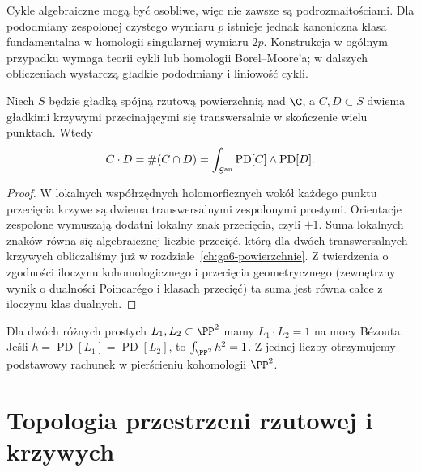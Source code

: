\begin{uwaga}
Cykle algebraiczne mogą być osobliwe, więc nie zawsze są
podrozmaitościami. Dla pododmiany zespolonej czystego wymiaru
$p$ istnieje jednak kanoniczna klasa fundamentalna w homologii
singularnej wymiaru $2p$. Konstrukcja w ogólnym przypadku
wymaga teorii cykli lub homologii Borel–Moore'a; w dalszych
obliczeniach wystarczą gładkie pododmiany i liniowość cykli.
\end{uwaga}

\begin{stwierdzenie}
\label{st:ga10-intersection}
Niech $S$ będzie gładką spójną rzutową powierzchnią nad $\C$,
a $C,D\subset S$ dwiema gładkimi krzywymi przecinającymi się
transwersalnie w skończenie wielu punktach. Wtedy
\[
 C\cdot D=\#(C\cap D)
 =\int_{S^{\rm an}}\operatorname{PD}[C]\wedge\operatorname{PD}[D].
\]
\end{stwierdzenie}
\begin{proof}
W lokalnych współrzędnych holomorficznych wokół każdego
punktu przecięcia krzywe są dwiema transwersalnymi
zespolonymi prostymi. Orientacje zespolone wymuszają dodatni
lokalny znak przecięcia, czyli $+1$. Suma lokalnych znaków
równa się algebraicznej liczbie przecięć, którą dla dwóch
transwersalnych krzywych obliczaliśmy już w
rozdziale~\ref{ch:ga6-powierzchnie}. Z twierdzenia o zgodności
iloczynu kohomologicznego i przecięcia geometrycznego
(zewnętrzny wynik o dualności Poincarégo i klasach przecięć) ta suma jest
równa całce z iloczynu klas dualnych.
\end{proof}

\begin{przyklad}
Dla dwóch różnych prostych $L_1,L_2\subset\PP^2$ mamy
$L_1\cdot L_2=1$ na mocy Bézouta. Jeśli
$h=\operatorname{PD}[L_1]=\operatorname{PD}[L_2]$,
to $\int_{\PP^2}h^2=1$. Z jednej liczby otrzymujemy
podstawowy rachunek w pierścieniu kohomologii $\PP^2$.
\end{przyklad}

\section{Topologia przestrzeni rzutowej i krzywych}
\label{sec:ga10-projektywne}

